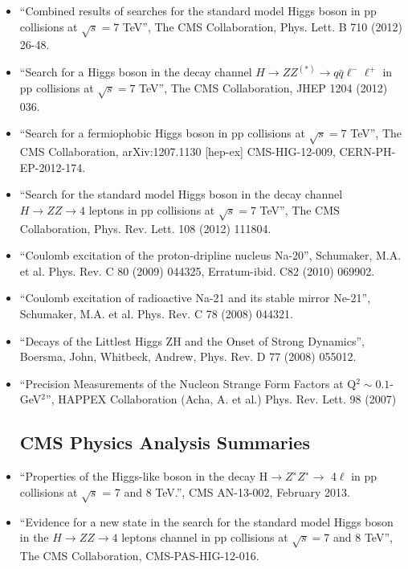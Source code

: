 \documentclass[12pt,oneside,final]{thesis}
\begin{document}
\begin{vita}
\begin{itemize}
\item ``Combined results of searches for the standard model Higgs boson in pp collisions at $\sqrt{s} = 7$ TeV'', The CMS Collaboration, Phys. Lett. B 710 (2012) 26-48.

\item ``Search for a Higgs boson in the decay channel $H \to ZZ^{(*)} \to q \bar{q} \ell^-\ell^+$ in pp collisions at $\sqrt{s} = 7$ TeV'', The CMS Collaboration, JHEP 1204 (2012) 036.

\item ``Search for a fermiophobic Higgs boson in pp collisions at $\sqrt{s}=7$ TeV'', The CMS Collaboration, arXiv:1207.1130 [hep-ex] CMS-HIG-12-009, CERN-PH-EP-2012-174.

\item ``Search for the standard model Higgs boson in the decay channel $H \to ZZ \to 4$ leptons in pp collisions at $\sqrt{s} = 7$ TeV'', The CMS Collaboration, Phys. Rev. Lett. 108 (2012) 111804. 

\item ``Coulomb excitation of the proton-dripline nucleus Na-20'', Schumaker, M.A. et al. Phys. Rev. C 80 (2009) 044325, Erratum-ibid. C82 (2010) 069902.

\item ``Coulomb excitation of radioactive Na-21 and its stable mirror Ne-21'', Schumaker, M.A. et al. Phys. Rev. C 78 (2008) 044321. 

\item ``Decays of the Littlest Higgs ZH and the Onset of Strong Dynamics'', Boersma, John, Whitbeck, Andrew, Phys. Rev. D 77 (2008) 055012.

\item ``Precision Measurements of the Nucleon Strange Form Factors at Q$^2\sim 0.1$-GeV$^2$'', HAPPEX Collaboration (Acha, A. et al.) Phys. Rev. Lett. 98 (2007)

\subsection*{CMS Physics Analysis Summaries}

\item ``Properties of the Higgs-like boson in the decay H$\to Z^∗ Z^∗\to$ 4$\ell$ in pp collisions at $\sqrt{s}$ = 7 and 8 TeV.'', CMS AN-13-002, February 2013.

\item ``Evidence for a new state in the search for the standard model Higgs boson in the $H \to ZZ \to 4$ leptons channel in pp collisions at $\sqrt{s} = $7 and 8 TeV'', The CMS Collaboration, CMS-PAS-HIG-12-016.


\end{itemize}
\end{vita}
\end{document}
